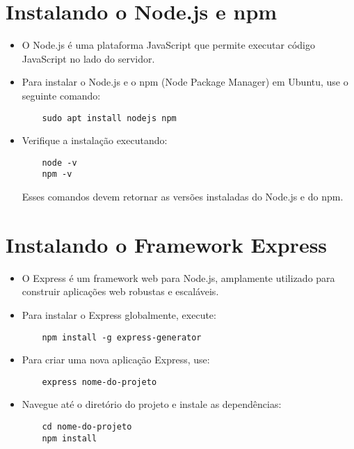 \section{Instalando o Node.js e npm}
\begin{itemize}
    \item O Node.js é uma plataforma JavaScript que permite executar código JavaScript no lado do servidor.
    \item Para instalar o Node.js e o npm (Node Package Manager) em Ubuntu, use o seguinte comando:
    \begin{verbatim}
    sudo apt install nodejs npm
    \end{verbatim}
    \item Verifique a instalação executando:
    \begin{verbatim}
    node -v
    npm -v
    \end{verbatim}
    Esses comandos devem retornar as versões instaladas do Node.js e do npm.
\end{itemize}

\section{Instalando o Framework Express}
\begin{itemize}
    \item O Express é um framework web para Node.js, amplamente utilizado para construir aplicações web robustas e escaláveis.
    \item Para instalar o Express globalmente, execute:
    \begin{verbatim}
    npm install -g express-generator
    \end{verbatim}
    \item Para criar uma nova aplicação Express, use:
    \begin{verbatim}
    express nome-do-projeto
    \end{verbatim}
    \item Navegue até o diretório do projeto e instale as dependências:
    \begin{verbatim}
    cd nome-do-projeto
    npm install
    \end{verbatim}
\end{itemize}

